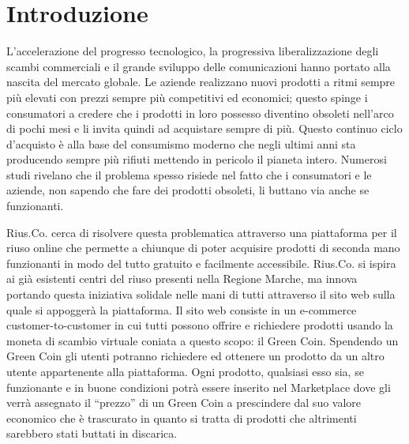 \section{Introduzione}
L'accelerazione del progresso tecnologico, la progressiva liberalizzazione degli scambi commerciali e il grande sviluppo delle comunicazioni hanno portato alla nascita del mercato globale. Le aziende realizzano nuovi prodotti a ritmi sempre più elevati con prezzi sempre più competitivi ed economici; questo spinge i consumatori a credere che i prodotti in loro possesso diventino obsoleti nell'arco di pochi mesi e li invita quindi ad acquistare sempre di più. Questo continuo ciclo d'acquisto è alla base del consumismo moderno che negli ultimi anni sta producendo sempre più rifiuti mettendo in pericolo il pianeta intero. Numerosi studi \cite{Sprechi} rivelano che il problema spesso risiede nel fatto che i consumatori e le aziende, non sapendo che fare dei prodotti obsoleti, li buttano via anche se funzionanti. 
\medskip

Rius.Co. cerca di risolvere questa problematica attraverso una piattaforma per il riuso online che permette a chiunque di poter acquisire prodotti di seconda mano funzionanti in modo del tutto gratuito e facilmente accessibile. Rius.Co. si ispira ai già esistenti centri del riuso presenti nella Regione Marche, ma innova portando questa iniziativa solidale nelle mani di tutti attraverso il sito web sulla quale si appoggerà la piattaforma. Il sito web consiste in un e-commerce customer-to-customer in cui tutti possono offrire e richiedere prodotti usando la moneta di scambio virtuale coniata a questo scopo: il Green Coin. Spendendo un Green Coin gli utenti potranno richiedere ed ottenere un prodotto da un altro utente appartenente alla piattaforma. Ogni prodotto, qualsiasi esso sia, se funzionante e in buone condizioni potrà essere inserito nel Marketplace dove gli verrà assegnato il “prezzo” di un Green Coin a prescindere dal suo valore economico che è trascurato in quanto si tratta di prodotti che altrimenti sarebbero stati buttati in discarica. 
\medskip

